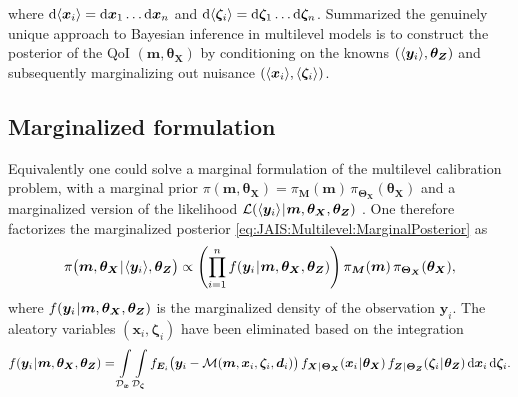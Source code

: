where \(\mathrm{d} \langle{\bm{x}_i}\rangle = \mathrm{d} \bm{x}_1 \ldots \mathrm{d} \bm{x}_n\) and \(\mathrm{d} \langle{\bm{\zeta}_i}\rangle = \mathrm{d} \bm{\zeta}_1 \ldots \mathrm{d} \bm{\zeta}_n\).
Summarized the genuinely unique approach to Bayesian inference in multilevel models is to construct the posterior of the QoI \((\bm{m},\bm{\theta}_{\bm{X}})\)
by conditioning on the knowns \((\langle{\bm{y}_i}\rangle,\bm{\theta}_{\bm{Z}})\) and subsequently marginalizing out nuisance \((\langle{\bm{x}_i}\rangle,\langle{\bm{\zeta}_i}\rangle)\).

\subsection{Marginalized formulation}
Equivalently one could solve a marginal formulation of the multilevel calibration problem,
with a marginal prior \(\pi(\bm{m},\bm{\theta}_{\bm{X}}) = \pi_{\bm{M}} (\bm{m}) \, \pi_{\bm{\Theta}_{\bm{X}}} (\bm{\theta}_{\bm{X}})\)
and a marginalized version of the likelihood \(\mathcal{L}(\langle{\bm{y}_i}\rangle {\:\!}|{\:\!} \bm{m},\bm{\theta}_{\bm{X}}, \bm{\theta}_{\bm{Z}})\) \cite{Statistics:Berger1999,Statistics:Severini2007}.
One therefore factorizes the marginalized posterior \cref{eq:JAIS:Multilevel:MarginalPosterior} as
\begin{equation} \label{eq:JAIS:Multilevel:Marginal:Factorization}
  \pi \big( \bm{m},\bm{\theta}_{\bm{X}} {\:\!}|{\:\!} \langle{\bm{y}_i}\rangle,\bm{\theta}_{\bm{Z}} \big)
  \propto \left( \prod_{i=1}^n f(\bm{y}_i {\:\!}|{\:\!} \bm{m},\bm{\theta}_{\bm{X}},\bm{\theta}_{\bm{Z}}) \right) \pi_{\bm{M}} (\bm{m}) \, \pi_{\bm{\Theta}_{\bm{X}}} (\bm{\theta}_{\bm{X}}),
\end{equation}
where \(f(\bm{y}_i {\:\!}|{\:\!} \bm{m},\bm{\theta}_{\bm{X}},\bm{\theta}_{\bm{Z}})\) is the marginalized density of the observation \(\bm{y}_i\).
The aleatory variables \((\bm{x}_i,\bm{\zeta}_i)\) have been eliminated based on the integration
\begin{equation} \label{eq:JAIS:Multilevel:Marginal:Marginalization}
  f(\bm{y}_i \cond \bm{m},\bm{\theta}_{\bm{X}},\bm{\theta}_{\bm{Z}}) = \int\limits_{\mathcal{D}_{\bm{x}}} \int\limits_{\mathcal{D}_{\bm{\zeta}}}
  f_{\bm{E}_i} \big( \bm{y}_i-\mathcal{M}(\bm{m},\bm{x}_i,\bm{\zeta}_i,\bm{d}_i) \big) \, f_{\bm{X} \cond \bm{\Theta}_{\bm{X}}} (\bm{x}_i \cond \bm{\theta}_{\bm{X}})
  \, f_{\bm{Z} \cond \bm{\Theta}_{\bm{Z}}}(\bm{\zeta}_i \cond \bm{\theta}_{\bm{Z}}) \, \mathrm{d} \bm{x}_i \, \mathrm{d} \bm{\zeta}_i.
\end{equation} 
